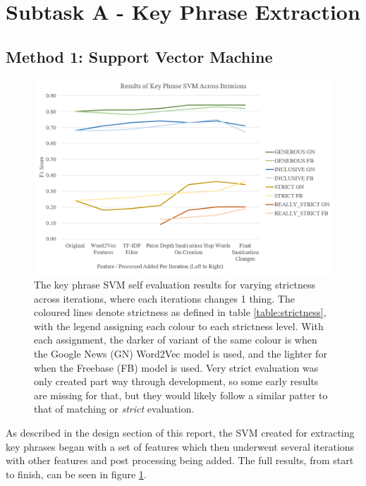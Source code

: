 \section{Subtask A - Key Phrase Extraction}

\subsection{Method 1: Support Vector Machine}

\begin{figure}[t]
	\includegraphics[width=\textwidth]{img/kpsvmresults.png}
	\caption[Key Phrase SVM Self Evaluation Through Iterations]{The key phrase SVM self evaluation results for varying strictness across iterations, where each iterations changes 1 thing. The coloured lines denote strictness as defined in table \ref{table:strictness}, with the legend assigning each colour to each strictness level. With each assignment, the darker of variant of the same colour is when the Google News (GN) Word2Vec model is used, and the lighter for when the Freebase (FB) model is used. Very strict evaluation was only created part way through development, so some early results are missing for that, but they would likely follow a similar patter to that of matching or \textit{strict} evaluation.}
	\label{figure:kpsvmresults}
\end{figure}

As described in the design section of this report, the SVM created for extracting key phrases began with a set of features which then underwent several iterations with other features and post processing being added. The full results, from start to finish, can be seen in figure \ref{figure:kpsvmresults}.

